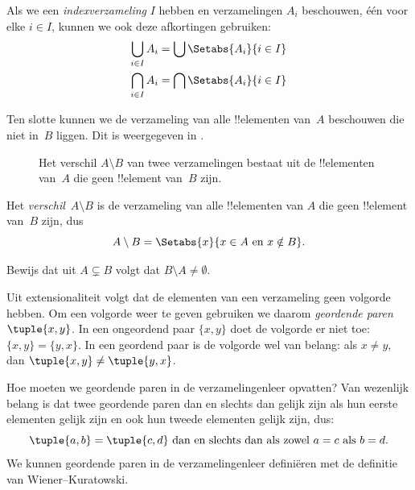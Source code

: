 \documentclass[openany]{memoir}
\begin{document}
Als we een \emph{indexverzameling} $I$ hebben en verzamelingen $A_i$
beschouwen, één voor elke $i \in I$, kunnen we ook deze afkortingen gebruiken:
\begin{align*}
	\bigcup_{i \in I} A_i & = \bigcup \Setabs{A_i }{i \in I}\\
	\bigcap_{i \in I} A_i & = \bigcap\Setabs{A_i}{i \in I}
\end{align*}

Ten slotte kunnen we de verzameling van alle !!{element}en van~$A$ beschouwen
die niet in~$B$ liggen. Dit is weergegeven in .

\begin{figure}
  \caption{Het verschil $A \setminus B$ van twee verzamelingen bestaat uit
    de !!{element}en van~$A$ die geen !!{element} van~$B$ zijn.}
\end{figure}

\begin{defn}[Verschil]
Het \emph{verschil}~$A \setminus B$ is de verzameling van alle !!{element}en
van $A$ die geen !!{element} van~$B$ zijn, dus
\[
A\setminus B = \Setabs{x}{x\in A \text{ en } x \notin B}.
\]
\end{defn}

\begin{prob}
	Bewijs dat uit $A \subsetneq B$ volgt dat $B \setminus A \neq \emptyset$.
\end{prob}
\endgroup

\begingroup
\def\olfilename{OLP-0009}
\def\olfilepath{content/sets-functions-relations/sets/}
\hypertarget{unit-OLP-0009}{}




\begin{explain}
Uit extensionaliteit volgt dat de elementen van een verzameling geen
volgorde hebben. Om een volgorde weer te geven gebruiken we daarom
\emph{geordende paren} $\tuple{x, y}$. In een ongeordend paar $\{x,
y\}$ doet de volgorde er niet toe: $\{x, y\} = \{y, x\}$. In een
geordend paar is de volgorde wel van belang: als $x \neq y$, dan
$\tuple{x, y} \neq \tuple{y, x}$.

Hoe moeten we geordende paren in de verzamelingenleer opvatten?
Van wezenlijk belang is dat twee geordende paren dan en slechts dan gelijk
zijn als hun eerste elementen gelijk zijn en ook hun tweede elementen
gelijk zijn, dus:
\[
  \tuple{a, b}= \tuple{c, d}\text{ dan en slechts dan als zowel }a = c \text{ als }b=d.
\]
We kunnen geordende paren in de verzamelingenleer definiëren met de
definitie van Wiener--Kuratowski.
\end{explain}
\end{document}
